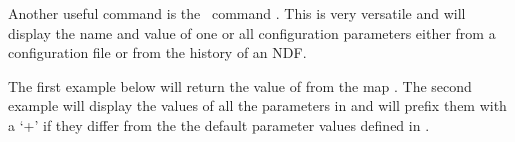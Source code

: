 \begin{description}
Another useful command is the \Kappa\ command \configecho.
This is very versatile and will display the name and value of one or
all configuration parameters either from a configuration file or from
the history of an NDF.

The first example below will return the value of  from
the map . The second example will display the values of all
the parameters in  and will prefix them with a `+' if they
differ from the the default parameter values defined in .

\begin{terminalv}
\end{terminalv}
\end{description}


